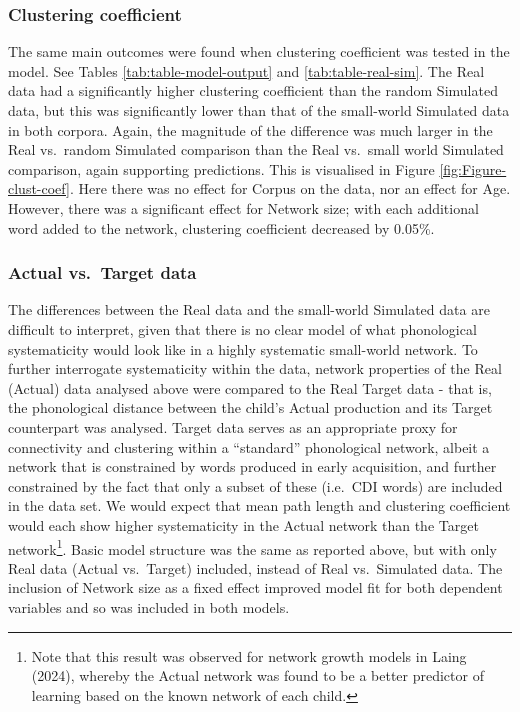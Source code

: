 \documentclass[
  man]{apa6}
\begin{document}
\subsubsection{Clustering coefficient}\label{clustering-coefficient}

The same main outcomes were found when clustering coefficient was tested in the model. See Tables \ref{tab:table-model-output} and \ref{tab:table-real-sim}. The Real data had a significantly higher clustering coefficient than the random Simulated data, but this was significantly lower than that of the small-world Simulated data in both corpora. Again, the magnitude of the difference was much larger in the Real vs.~random Simulated comparison than the Real vs.~small world Simulated comparison, again supporting predictions. This is visualised in Figure \ref{fig:Figure-clust-coef}. Here there was no effect for Corpus on the data, nor an effect for Age. However, there was a significant effect for Network size; with each additional word added to the network, clustering coefficient decreased by 0.05\%.

\subsubsection{Actual vs.~Target data}\label{actual-vs.-target-data}

The differences between the Real data and the small-world Simulated data are difficult to interpret, given that there is no clear model of what phonological systematicity would look like in a highly systematic small-world network. To further interrogate systematicity within the data, network properties of the Real (Actual) data analysed above were compared to the Real Target data - that is, the phonological distance between the child's Actual production and its Target counterpart was analysed. Target data serves as an appropriate proxy for connectivity and clustering within a ``standard'' phonological network, albeit a network that is constrained by words produced in early acquisition, and further constrained by the fact that only a subset of these (i.e.~CDI words) are included in the data set. We would expect that mean path length and clustering coefficient would each show higher systematicity in the Actual network than the Target network\footnote{Note that this result was observed for network growth models in Laing (2024), whereby the Actual network was found to be a better predictor of learning based on the known network of each child.}. Basic model structure was the same as reported above, but with only Real data (Actual vs.~Target) included, instead of Real vs.~Simulated data. The inclusion of Network size as a fixed effect improved model fit for both dependent variables and so was included in both models.
\end{document}
